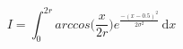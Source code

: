 \documentclass[preview]{standalone}
\begin{document}
\begin{equation*}
I =  \int_0^{2r} arccos\Big(\frac{x}{2r}\Big) e^\frac{-(x-0.5)^2}{2\sigma^2}\, \mathrm{d}x
\end{equation*}
\end{document}
